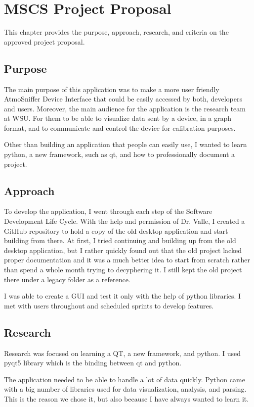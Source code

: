 \chapter{MSCS Project Proposal} %
This chapter provides the purpose, approach, research, and criteria on the approved project proposal.
\section{Purpose}
The main purpose of this application was to make a more user friendly AtmoSniffer Device Interface that could be easily accessed by both, developers and users.
Moreover, the main audience for the application is the research team at WSU. For them to be able to visualize data sent by a device, in a graph format, and to communicate and control the device for calibration purposes.

Other than building an application that people can easily use, I wanted to learn python, a new framework, such as qt, and how to professionally document a project.

\section{Approach}
To develop the application, I went through each step of the Software Development Life Cycle. With the help and permission of Dr. Valle, I created a GitHub repository to hold a copy of the old desktop application and start building from there. At first, I tried continuing and building up from the old desktop application, but I rather quickly found out that the old project lacked proper documentation and it was a much better idea to start from scratch rather than spend a whole month trying to decyphering it. I still kept the old project there under a legacy folder as a reference.

I was able to create a GUI and test it only with the help of python libraries. I met with users throughout and scheduled sprints to develop features.
\section{Research}
Research was focused on learning a QT, a new framework, and python. I used pyqt5 library which is the binding between qt and python.

The application needed to be able to handle a lot of data quickly. Python came with a big number of libraries used for data visualization, analysis, and parsing. This is the reason we chose it, but also because I have always wanted to learn it.

